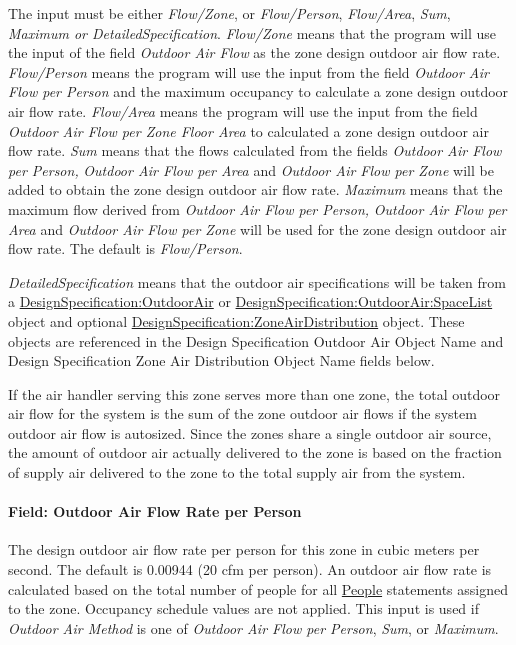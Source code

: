 The input must be either \emph{Flow/Zone}, or \emph{Flow/Person}, \emph{Flow/Area}, \emph{Sum}, \emph{Maximum or DetailedSpecification}. \emph{Flow/Zone} means that the program will use the input of the field \emph{Outdoor Air Flow} as the zone design outdoor air flow rate. \emph{Flow/Person} means the program will use the input from the field \emph{Outdoor Air Flow per Person} and the maximum occupancy to calculate a zone design outdoor air flow rate. \emph{Flow/Area} means the program will use the input from the field \emph{Outdoor Air Flow per Zone Floor Area} to calculated a zone design outdoor air flow rate. \emph{Sum} means that the flows calculated from the fields \emph{Outdoor Air Flow per Person,} \emph{Outdoor Air Flow per Area} and \emph{Outdoor Air Flow per Zone} will be added to obtain the zone design outdoor air flow rate. \emph{Maximum} means that the maximum flow derived from \emph{Outdoor Air Flow per Person,} \emph{Outdoor Air Flow per Area} and \emph{Outdoor Air Flow per Zone} will be used for the zone design outdoor air flow rate. The default is \emph{Flow/Person}.

\emph{DetailedSpecification} means that the outdoor air specifications will be taken from a \hyperref[designspecificationoutdoorair]{DesignSpecification:OutdoorAir} or \hyperref[designspecificationoutdoorairspacelist]{DesignSpecification:OutdoorAir:SpaceList} object and optional \hyperref[designspecificationzoneairdistribution]{DesignSpecification:ZoneAirDistribution} object. These objects are referenced in the Design Specification Outdoor Air Object Name and Design Specification Zone Air Distribution Object Name fields below.

If the air handler serving this zone serves more than one zone, the total outdoor air flow for the system is the sum of the zone outdoor air flows if the system outdoor air flow is autosized. Since the zones share a single outdoor air source, the amount of outdoor air actually delivered to the zone is based on the fraction of supply air delivered to the zone to the total supply air from the system.

\paragraph{Field: Outdoor Air Flow Rate per Person}\label{field-outdoor-air-flow-rate-per-person-9}

The design outdoor air flow rate per person for this zone in cubic meters per second. The default is 0.00944 (20 cfm per person). An outdoor air flow rate is calculated based on the total number of people for all \hyperref[people]{People} statements assigned to the zone. Occupancy schedule values are not applied. This input is used if \emph{Outdoor Air Method} is one of \emph{Outdoor Air Flow per Person}, \emph{Sum}, or \emph{Maximum}.

